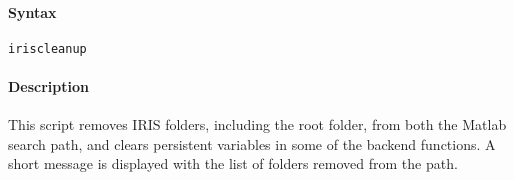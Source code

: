


	\paragraph{Syntax}\label{syntax}

\begin{verbatim}
iriscleanup
\end{verbatim}

\paragraph{Description}\label{description}

This script removes IRIS folders, including the root folder, from both
the Matlab search path, and clears persistent variables in some of the
backend functions. A short message is displayed with the list of folders
removed from the path.


